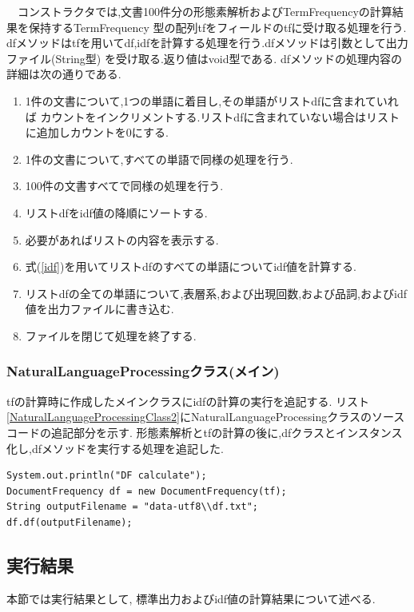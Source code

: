 \documentclass[a4j]{jarticle}
\begin{document}
　コンストラクタでは,文書100件分の形態素解析およびTermFrequencyの計算結果を保持するTermFrequency
型の配列tfをフィールドのtfに受け取る処理を行う.\\
dfメソッドはtfを用いてdf,idfを計算する処理を行う.dfメソッドは引数として出力ファイル(String型)
を受け取る.返り値はvoid型である.
dfメソッドの処理内容の詳細は次の通りである.
\begin{enumerate}
	\item 1件の文書について,1つの単語に着目し,その単語がリストdfに含まれていれば
	カウントをインクリメントする.リストdfに含まれていない場合はリストに追加しカウントを0にする.
	\item 1件の文書について,すべての単語で同様の処理を行う.
	\item 100件の文書すべてで同様の処理を行う. 
	\item リストdfをidf値の降順にソートする.
	\item 必要があればリストの内容を表示する.
	\item 式(\ref{idf})を用いてリストdfのすべての単語についてidf値を計算する.
	\item リストdfの全ての単語について,表層系,および出現回数,および品詞,およびidf値を出力ファイルに書き込む.
	\item ファイルを閉じて処理を終了する.
\end{enumerate}

\subsubsection{NaturalLanguageProcessingクラス(メイン)}
tfの計算時に作成したメインクラスにidfの計算の実行を追記する.
リスト\ref{NaturalLanguageProcessingClass2}にNaturalLanguageProcessingクラスのソースコードの追記部分を示す.
形態素解析とtfの計算の後に,dfクラスとインスタンス化し,dfメソッドを実行する処理を追記した.
\begin{lstlisting}[basicstyle=\ttfamily\footnotesize, frame=single,label=NaturalLanguageProcessingClass2,caption=NaturalLanguageProcessingクラスのソースコード(追記部分)]
System.out.println("DF calculate");
DocumentFrequency df = new DocumentFrequency(tf);
String outputFilename = "data-utf8\\df.txt";
df.df(outputFilename);
	\end{lstlisting}
\subsection{実行結果}
本節では実行結果として, 標準出力およびidf値の計算結果について述べる.
\end{document}
